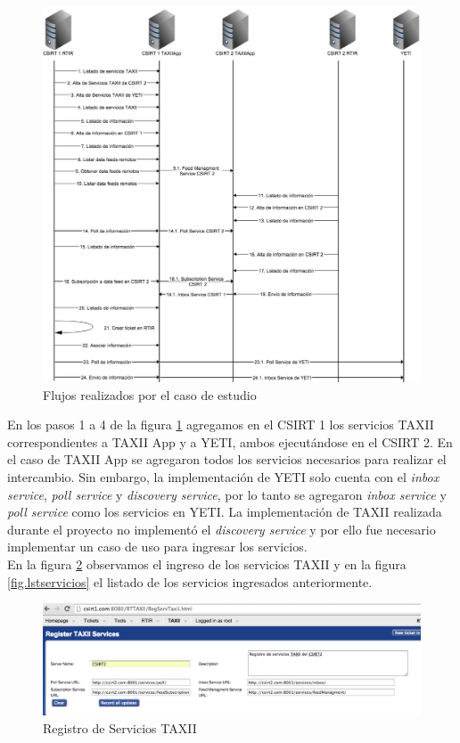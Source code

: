 \begin{figure}[H]
	\centering
	\includegraphics[scale=0.35]{caso-de-estudio/flujos.png}
	\caption{Flujos realizados por el caso de estudio}
	\label{fig.flujos}
\end{figure}

En los pasos 1 a 4 de la figura \ref{fig.flujos} agregamos en el CSIRT 1 los servicios TAXII correspondientes a TAXII App y a YETI, ambos ejecutándose en el CSIRT 2.
En el caso de TAXII App se agregaron todos los servicios necesarios para realizar el intercambio. Sin embargo, la implementación de YETI solo cuenta con el \textit{inbox service}, \textit{poll service} y \textit{discovery service}, por lo tanto se agregaron \textit{inbox service} y \textit{poll service} como los servicios en YETI. La implementación de TAXII realizada durante el proyecto no implementó el \textit{discovery service} y por ello fue necesario implementar un caso de uso para ingresar los servicios. \\
\bigskip
En la figura \ref{fig.regservicios} observamos el ingreso de los servicios TAXII y en la figura \ref{fig.lstservicios} el listado de los servicios ingresados anteriormente.

\begin{figure}[H]
	\centering
	\includegraphics[scale=0.4]{caso-de-estudio/RegistroServicios.png}
	\caption{Registro de Servicios TAXII}
	\label{fig.regservicios}
\end{figure}


